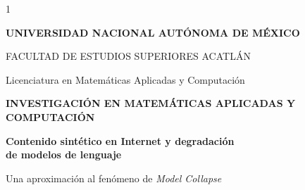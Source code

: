 \documentclass[12pt,letterpaper]{article}
\begin{document}

\begin{titlepage}

\thispagestyle{empty}

\begin{spacing}{1}


\begin{center}

\vspace*{0.5cm}

{\large\bfseries
UNIVERSIDAD NACIONAL AUTÓNOMA DE MÉXICO
}

\vspace{0.25cm}

{\large
FACULTAD DE ESTUDIOS SUPERIORES ACATLÁN
}

\vspace{0.15cm}

{\normalsize
Licenciatura en Matemáticas Aplicadas y Computación
}


\vspace{1.35cm}

{\large\bfseries
INVESTIGACIÓN EN MATEMÁTICAS APLICADAS Y\\
COMPUTACIÓN
}


\vspace{1.35cm}

{\LARGE\bfseries
Contenido sintético en Internet y degradación\\[0.15cm]
de modelos de lenguaje
}

\vspace{0.4cm}

{\large
Una aproximación al fenómeno de \textit{Model Collapse}
}

\end{center}



\end{spacing}
\end{titlepage}
\end{document}
